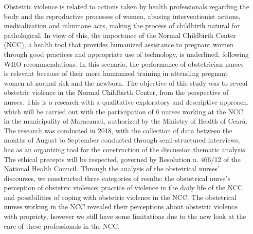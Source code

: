 Obstetric violence is related to actions taken by health professionals regarding the body and the reproductive processes of women, abusing interventionist actions, medicalization and inhumane acts, making the process of childbirth natural for pathological. In view of this, the importance of the Normal Childbirth Center (NCC), a health tool that provides humanized assistance to pregnant women through good practices and appropriate use of technology, is underlined, following WHO recommendations. In this scenario, the performance of obstetrician nurses is relevant because of their more humanized training in attending pregnant women at normal risk and the newborn. The objective of this study was to reveal obstetric violence in the Normal Childbirth Center, from the perspective of nurses. This is a research with a qualitative exploratory and descriptive approach, which will be carried out with the participation of 6 nurses working at the NCC in the municipality of Maracanaú, authorized by the Ministry of Health of Ceará. The research was conducted in 2018, with the collection of data between the months of August to September conducted through semi-structured interviews, has as an organizing tool for the construction of the discussion thematic analysis. The ethical precepts will be respected, governed by Resolution n. 466/12 of the National Health Council. Through the analysis of the obstetrical nurses' discourses, we constructed three categories of results: the obstetrical nurse's perception of obstetric violence; practice of violence in the daily life of the NCC and possibilities of coping with obstetric violence in the NCC. The obstetrical nurses working in the NCC revealed their perceptions about obstetric violence with propriety, however we still have some limitations due to the new look at the care of these professionals in the NCC.

